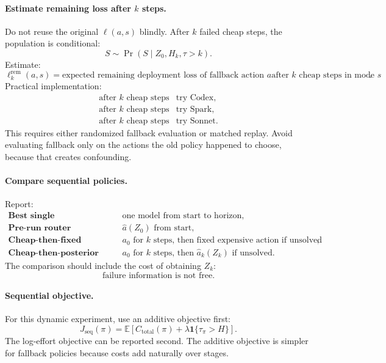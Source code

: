 \documentclass{article}
\begin{document}
\paragraph{Estimate remaining loss after \(k\) steps.}
Do not reuse the original \(\ell(a,s)\) blindly.
After \(k\) failed cheap steps, the population is conditional:
\[
    S\sim\Pr(S\mid Z_0,H_k,\tau>k).
\]
Estimate:
\[
    \ell^{\mathrm{rem}}_k(a,s)
    =
    \text{expected remaining deployment loss of fallback action \(a\)
    after \(k\) cheap steps in mode \(s\)}.
\]
Practical implementation:
\[
\begin{array}{ll}
    \text{after \(k\) cheap steps} & \text{try Codex},\\
    \text{after \(k\) cheap steps} & \text{try Spark},\\
    \text{after \(k\) cheap steps} & \text{try Sonnet}.
\end{array}
\]
This requires either randomized fallback evaluation or matched replay.
Avoid evaluating fallback only on the actions the old policy happened to choose, because
that creates confounding.

\paragraph{Compare sequential policies.}
Report:
\[
\begin{array}{ll}
    \textbf{Best single} &
    \text{one model from start to horizon},\\
    \textbf{Pre-run router} &
    \hat a(Z_0)\text{ from start},\\
    \textbf{Cheap-then-fixed fallback} &
    a_0\text{ for \(k\) steps, then fixed expensive action if unsolved},\\
    \textbf{Cheap-then-posterior fallback} &
    a_0\text{ for \(k\) steps, then }\hat a_k(Z_k)\text{ if unsolved}.
\end{array}
\]
The comparison should include the cost of obtaining \(Z_k\):
\[
    \text{failure information is not free.}
\]

\paragraph{Sequential objective.}
For this dynamic experiment, use an additive objective first:
\[
    J_{\mathrm{seq}}(\pi)
    =
    \mathbb E
    \left[
        C_{\mathrm{total}}(\pi)
        +
        \lambda\mathbf 1\{\tau_\pi>H\}
    \right].
\]
The log-effort objective can be reported second.
The additive objective is simpler for fallback policies because costs add naturally over stages.
\end{document}
